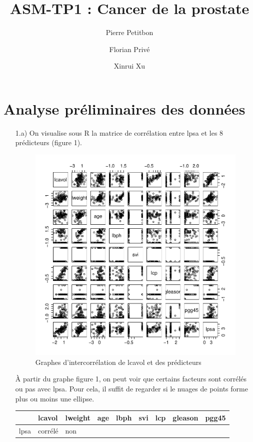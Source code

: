 \documentclass[a4paper, 12pt]{article}
\title{ASM-TP1 : Cancer de la prostate}
\author{Pierre Petitbon \and Florian Privé \and Xinrui Xu}
\date{}
\begin{document}
\maketitle

\section{Analyse préliminaires des données}

\begin{enumerate}
\setlength{\itemsep}{20pt}

\item[1.a)] On visualise sous R la matrice de corrélation entre lpsa et les 8 prédicteurs (figure 1). 

\begin{figure}
\begin{center}
\includegraphics[scale=1]{pairs_pro.pdf}
\caption{Graphes d'intercorrélation de lcavol et des prédicteurs}
\end{center}
\end{figure}

À partir du graphe figure 1, on peut voir que certains facteurs sont corrélés ou pas avec lpsa. Pour cela, il suffit de regarder si le nuages de points forme plus ou moins une ellipse. 

\begin{tabular}{|p{0.5cm}|p{1.5cm}|p{1.5cm}|p{1.5cm}|p{1.5cm}|p{1.5cm}|p{1.5cm}|p{1.5cm}|p{1.5cm}|}
  \hline
       & lcavol & lweight & age & lbph & svi & lcp & gleason & pgg45 \\
  \hline
  lpsa & corrélé & non 


\end{tabular}
\end{enumerate}
\end{document}
